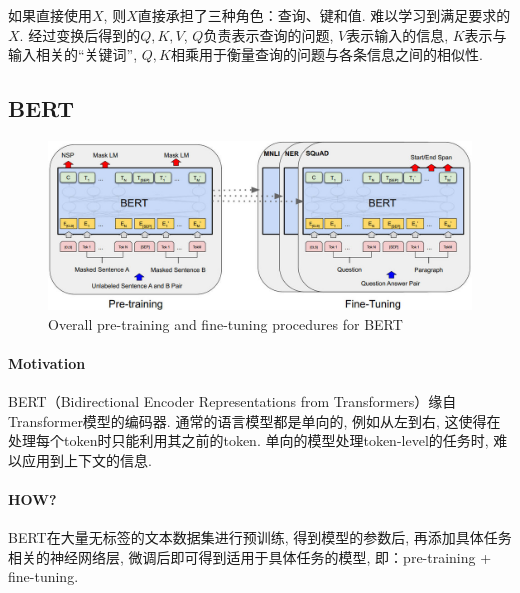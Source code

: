 如果直接使用$X$, 则$X$直接承担了三种角色：查询、键和值. 难以学习到满足要求的$X$. 经过变换后得到的$Q, K, V$, $Q$负责表示查询的问题, $V$表示输入的信息, $K$表示与输入相关的“关键词”, $Q, K$相乘用于衡量查询的问题与各条信息之间的相似性. 

\subsection{BERT}
\begin{figure}[h] 
	\centering
	\includegraphics[width=.9\textwidth]{pics/bert-pre training-fine tunning.jpg}
	\caption{Overall pre-training and fine-tuning procedures for BERT}
	\label{fig:bert-pf}
\end{figure}

\paragraph{Motivation}
BERT（Bidirectional Encoder Representations from Transformers）\cite{devlin2019bert}缘自Transformer模型的编码器. 通常的语言模型都是单向的, 例如从左到右, 这使得在处理每个token时只能利用其之前的token. 单向的模型处理token-level的任务时, 难以应用到上下文的信息. 

\paragraph{HOW?}
BERT在大量无标签的文本数据集进行预训练, 得到模型的参数后, 再添加具体任务相关的神经网络层, 微调后即可得到适用于具体任务的模型, 即：pre-training + fine-tuning. 

